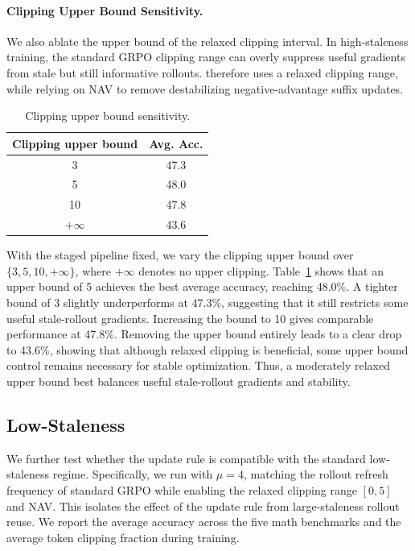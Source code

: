 \paragraph{Clipping Upper Bound Sensitivity.}
We also ablate the upper bound of the relaxed clipping interval. In
high-staleness training, the standard GRPO clipping range can overly suppress useful gradients from stale but still informative rollouts.
\ourmethod{} therefore uses a relaxed clipping range, while relying on NAV to remove destabilizing negative-advantage suffix updates.
\begin{table}[!h]
\vspace{-11pt}
\centering
\small
\caption{Clipping upper bound sensitivity.}
\label{tab:clip_upper_ablation}
\begin{tabular}{cc}
\toprule
Clipping upper bound & Avg. Acc. \\
\midrule
3 & 47.3 \\
\rowcolor{gray!20}
5 & 48.0 \\
10 & 47.8 \\
$+\infty$ & 43.6 \\
\bottomrule
\end{tabular}
\vspace{-3pt}
\end{table}
With the staged pipeline fixed, we vary the clipping upper bound over
$\{3, 5, 10, +\infty\}$, where $+\infty$ denotes no upper clipping. Table~\ref{tab:clip_upper_ablation} shows that an upper bound of 5 achieves the best average accuracy, reaching 48.0\%. A tighter bound of 3 slightly underperforms at 47.3\%, suggesting that it still restricts some useful stale-rollout gradients. Increasing the bound to 10 gives comparable  performance at 47.8\%. Removing the upper bound entirely leads to a clear drop to 43.6\%, showing that although relaxed clipping is beneficial, some upper bound control remains necessary for stable optimization. Thus, a moderately relaxed upper bound best balances useful stale-rollout gradients and stability.

\subsection{Low-Staleness \boldmath{\ourmethod}}
\label{app:onpolicy_relaxed_nav}

We further test whether the \ourmethod{} update rule is compatible with the standard low-staleness regime. Specifically, we run \ourmethod{} with $\mu=4$, matching the rollout refresh frequency of standard GRPO while enabling the relaxed clipping range $[0,5]$ and NAV. This isolates the effect of the update rule from large-staleness rollout reuse. We report the average accuracy across the five math benchmarks and the average token clipping fraction during training.

